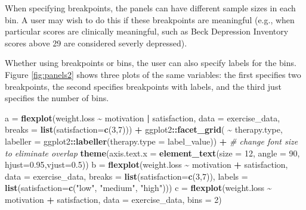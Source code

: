 \documentclass[
  man]{apa6}
\newenvironment{Shaded}{\begin{snugshade}}{\end{snugshade}}
\newcommand{\CommentTok}[1]{\textcolor[rgb]{0.56,0.35,0.01}{\textit{#1}}}
\newcommand{\DataTypeTok}[1]{\textcolor[rgb]{0.13,0.29,0.53}{#1}}
\newcommand{\DecValTok}[1]{\textcolor[rgb]{0.00,0.00,0.81}{#1}}
\newcommand{\FloatTok}[1]{\textcolor[rgb]{0.00,0.00,0.81}{#1}}
\newcommand{\KeywordTok}[1]{\textcolor[rgb]{0.13,0.29,0.53}{\textbf{#1}}}
\newcommand{\NormalTok}[1]{#1}
\newcommand{\OperatorTok}[1]{\textcolor[rgb]{0.81,0.36,0.00}{\textbf{#1}}}
\newcommand{\StringTok}[1]{\textcolor[rgb]{0.31,0.60,0.02}{#1}}
\begin{document}
When specifying breakpoints, the panels can have different sample sizes in each bin. A user may wish to do this if these breakpoints are meaningful (e.g., when particular scores are clinically meaningful, such as Beck Depression Inventory scores above 29 are considered severly depressed).

Whether using breakpoints or bins, the user can also specify labels for the bins. Figure \ref{fig:panels2} shows three plots of the same variables: the first specifies two breakpoints, the second specifies breakpoints with labels, and the third just specifies the number of bins.

\small

\begin{Shaded}
\begin{Highlighting}[]
\NormalTok{a =}\StringTok{ }\KeywordTok{flexplot}\NormalTok{(weight.loss }\OperatorTok{\textasciitilde{}}\StringTok{ }\NormalTok{motivation }\OperatorTok{|}\StringTok{ }\NormalTok{satisfaction, }
             \DataTypeTok{data =}\NormalTok{ exercise\_data, }
             \DataTypeTok{breaks =} \KeywordTok{list}\NormalTok{(}\DataTypeTok{satisfaction=}\KeywordTok{c}\NormalTok{(}\DecValTok{3}\NormalTok{,}\DecValTok{7}\NormalTok{))) }\OperatorTok{+}
\StringTok{  }\NormalTok{ggplot2}\OperatorTok{::}\KeywordTok{facet\_grid}\NormalTok{( }\OperatorTok{\textasciitilde{}}\StringTok{ }\NormalTok{therapy.type, }
              \DataTypeTok{labeller =}\NormalTok{ ggplot2}\OperatorTok{::}\KeywordTok{labeller}\NormalTok{(}\DataTypeTok{therapy.type =}\NormalTok{ label\_value)) }\OperatorTok{+}
\StringTok{  }\CommentTok{\# change font size to eliminate overlap}
\StringTok{    }\KeywordTok{theme}\NormalTok{(}\DataTypeTok{axis.text.x =} 
            \KeywordTok{element\_text}\NormalTok{(}\DataTypeTok{size =} \DecValTok{12}\NormalTok{, }\DataTypeTok{angle =} \DecValTok{90}\NormalTok{, }\DataTypeTok{hjust=}\FloatTok{0.95}\NormalTok{,}\DataTypeTok{vjust=}\FloatTok{0.5}\NormalTok{))}
\NormalTok{b =}\StringTok{ }\KeywordTok{flexplot}\NormalTok{(weight.loss }\OperatorTok{\textasciitilde{}}\StringTok{ }\NormalTok{motivation }\OperatorTok{+}\StringTok{ }\NormalTok{satisfaction, }
             \DataTypeTok{data =}\NormalTok{ exercise\_data, }
             \DataTypeTok{breaks =} \KeywordTok{list}\NormalTok{(}\DataTypeTok{satisfaction=}\KeywordTok{c}\NormalTok{(}\DecValTok{3}\NormalTok{,}\DecValTok{7}\NormalTok{)), }
             \DataTypeTok{labels =} \KeywordTok{list}\NormalTok{(}\DataTypeTok{satisfaction=}\KeywordTok{c}\NormalTok{(}\StringTok{"low"}\NormalTok{, }\StringTok{"medium"}\NormalTok{, }\StringTok{"high"}\NormalTok{)))}
\NormalTok{c =}\StringTok{ }\KeywordTok{flexplot}\NormalTok{(weight.loss }\OperatorTok{\textasciitilde{}}\StringTok{ }\NormalTok{motivation }\OperatorTok{+}\StringTok{ }\NormalTok{satisfaction, }
             \DataTypeTok{data =}\NormalTok{ exercise\_data, }
             \DataTypeTok{bins =} \DecValTok{2}\NormalTok{) }
\end{Highlighting}
\end{Shaded}
\end{document}
